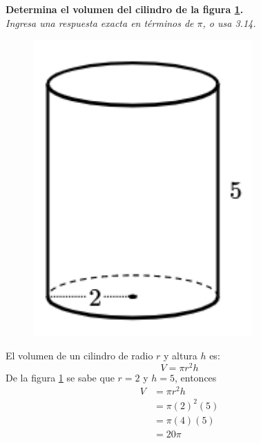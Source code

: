 \question[10] \textbf{Determina el volumen del cilindro de la figura \ref{fig:vol_cil_01}.}\\
\textit{Ingresa una respuesta exacta en términos de $\pi$, o usa 3.14.}

\begin{minipage}{0.3\linewidth}
    \begin{figure}[H]
        \begin{center}
            \includegraphics[width=0.75\textwidth]{../images/vol_cil_01.png}
        \end{center}
        \caption{}
        \label{fig:vol_cil_01}
    \end{figure}
\end{minipage}
\begin{minipage}{0.7\linewidth}
    \begin{solutionbox}{6cm}        El volumen de un cilindro de radio $r$ y altura $h$ es:
        \begin{equation*}
            V = \pi r^2 h
        \end{equation*}
        De la figura \ref{fig:vol_cil_01} se sabe que $r=2$ y $h=5$, entonces
        \begin{equation*}
            \begin{split}
                V & = \pi r^2 h\\
                & = \pi (2)^2 (5)\\
                & = \pi (4) (5)\\
                & = 20\pi
            \end{split}
        \end{equation*}
    \end{solutionbox}
\end{minipage}
